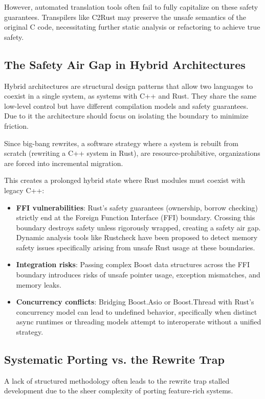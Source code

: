 However, automated translation tools often fail to fully capitalize on these safety guarantees. 
Transpilers like C2Rust may preserve the unsafe semantics of the original C code, 
necessitating further static analysis or refactoring to achieve true safety. \parencite{ling2022rust,hong2023improving}

\subsection{The Safety Air Gap in Hybrid Architectures}

Hybrid architectures are structural design patterns that allow two languages to coexist in a single system, 
as systems with C++ and Rust. They share the same low-level control but have different compilation models and 
safety guarantees. Due to it the architecture should focus on isolating the boundary to minimize friction.

Since big-bang rewrites, a software strategy where a system is rebuilt from scratch (rewriting a C++ system in Rust), 
are resource-prohibitive, organizations are forced into incremental migration.

This creates a prolonged hybrid state where Rust modules must coexist with legacy C++:

\begin{itemize}
    \item \textbf{FFI vulnerabilities}: Rust's safety guarantees (ownership, borrow checking) strictly end at 
    the Foreign Function Interface (FFI) boundary. Crossing this boundary destroys safety unless rigorously wrapped, 
    creating a safety air gap. Dynamic analysis tools like Rustcheck have been proposed to detect memory safety issues 
    specifically arising from unsafe Rust usage at these boundaries. \parencite{xia2023rustcheck}
    \item \textbf{Integration risks}: Passing complex Boost data structures across the FFI boundary introduces risks 
    of unsafe pointer usage, exception mismatches, and memory leaks.
    \item \textbf{Concurrency conflicts}: Bridging Boost.Asio or Boost.Thread with Rust's concurrency model can lead to 
    undefined behavior, specifically when distinct async runtimes or threading models attempt to interoperate 
    without a unified strategy.
\end{itemize}

\subsection{Systematic Porting vs. the Rewrite Trap}
A lack of structured methodology often leads to the rewrite trap stalled development due to the sheer complexity of 
porting feature-rich systems.

